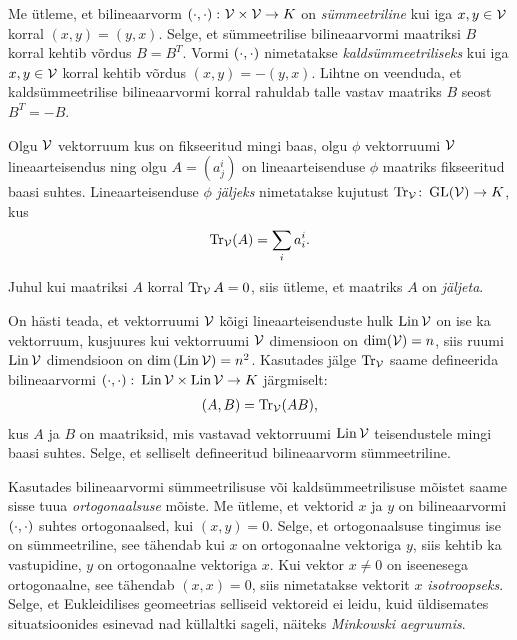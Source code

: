 Me ütleme, et bilineaarvorm $\left( \cdot, \cdot \right) \colon \mathcal{V} \times \mathcal{V} \to K$ on
\emph{sümmeetriline} kui
iga $x, y \in \mathcal{V}$ korral $(x, y) = (y, x)$. Selge, et sümmeetrilise
bilineaarvormi maatriksi $B$ korral kehtib võrdus $B = B^T$. Vormi $\left( \cdot, \cdot \right)$
nimetatakse \emph{kaldsümmeetriliseks} kui iga $x, y \in \mathcal{V}$ korral kehtib
võrdus $(x, y) = - (y, x)$. Lihtne on veenduda, et kaldsümmeetrilise
bilineaarvormi korral rahuldab talle vastav maatriks $B$ seost
$B^T = -B$.

\begin{dfn}
    Olgu $\mathcal{V}$ vektorruum kus on fikseeritud mingi baas, olgu $\phi$
    vektorruumi $\mathcal{V}$ lineaarteisendus ning olgu $A = (a^i_j)$ on
    lineaarteisenduse $\phi$ maatriks fikseeritud baasi suhtes.
    Lineaarteisenduse $\phi$ \emph{jäljeks} nimetatakse kujutust
    $\operatorname{Tr}_{\mathcal{V}} \colon \operatorname{GL}(\mathcal{V}) \to K$, kus
    \begin{align*}
        \operatorname{Tr}_{\mathcal{V}}(A) = \sum_i a^i_i.
    \end{align*}
\end{dfn}

Juhul kui maatriksi $A$ korral $\operatorname{Tr}_{\mathcal{V}} A = 0$, siis ütleme, et
maatriks $A$ on \emph{jäljeta}.

\begin{naide}
    On hästi teada, et vektorruumi $\mathcal{V}$ kõigi lineaarteisenduste hulk $\operatorname{Lin} \mathcal{V}$
    on ise ka vektorruum, kusjuures kui vektorruumi $\mathcal{V}$ dimensioon
    on $\dim(\mathcal{V}) = n$, siis ruumi $\operatorname{Lin} \mathcal{V}$ dimendsioon on
    $\dim \left(\operatorname{Lin} \mathcal{V}\right) = n^2$. Kasutades jälge $\operatorname{Tr}_{\mathcal{V}}$ saame
    defineerida bilineaarvormi
    $\left( \cdot, \cdot \right) \colon \operatorname{Lin} \mathcal{V} \times \operatorname{Lin} \mathcal{V} \to K$ järgmiselt:
    \begin{align*}
        (A, B) = \operatorname{Tr}_{\mathcal{V}}(AB),
    \end{align*}
    kus $A$ ja $B$ on maatriksid, mis vastavad vektorruumi $\operatorname{Lin} \mathcal{V}$
    teisendustele mingi baasi suhtes. Selge, et selliselt defineeritud
    bilineaarvorm sümmeetriline.
\end{naide}

Kasutades bilineaarvormi sümmeetrilisuse või kaldsümmeetrilisuse mõistet
saame sisse tuua \emph{ortogonaalsuse} mõiste. Me ütleme, et vektorid $x$ ja $y$
on bilineaarvormi $\left( \cdot, \cdot \right)$ suhtes ortogonaalsed, kui $(x, y) = 0$. Selge, et
ortogonaalsuse tingimus ise on sümmeetriline, see tähendab kui $x$ on
ortogonaalne vektoriga $y$, siis kehtib ka vastupidine, $y$ on ortogonaalne
vektoriga $x$. Kui vektor $x \neq 0$ on iseenesega ortogonaalne, see tähendab
$(x, x) = 0$, siis nimetatakse vektorit $x$ \emph{isotroopseks}. Selge, et
Eukleidilises geomeetrias selliseid vektoreid ei leidu, kuid üldisemates
situatsioonides esinevad nad küllaltki sageli, näiteks
\emph{Minkowski aegruumis}.

